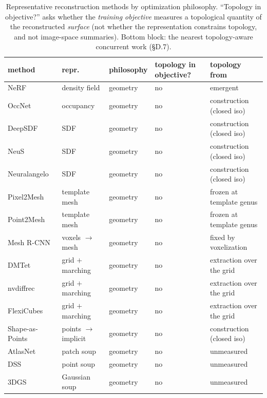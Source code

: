 \begin{table}[t]
\centering
\caption{Representative reconstruction methods by optimization
philosophy. ``Topology in objective?'' asks whether the \emph{training
objective} measures a topological quantity of the reconstructed
\emph{surface} (not whether the representation constrains topology, and
not image-space summaries). Bottom block: the nearest topology-aware
concurrent work (\S D.7).}
\label{tab:philosophy}
\footnotesize
\setlength{\tabcolsep}{3pt}
\begin{tabular}{lllll}
\toprule
method & repr. & philosophy & topology in objective? & topology from \\
\midrule
NeRF~\citep{mildenhall2020nerf} & density field & geometry & no & emergent \\
OccNet~\citep{mescheder2019occupancy} & occupancy & geometry & no & construction (closed iso) \\
DeepSDF~\citep{park2019deepsdf} & SDF & geometry & no & construction (closed iso) \\
NeuS~\citep{wang2021neus} & SDF & geometry & no & construction (closed iso) \\
Neuralangelo~\citep{li2023neuralangelo} & SDF & geometry & no & construction (closed iso) \\
Pixel2Mesh~\citep{wang2018pixel2mesh} & template mesh & geometry & no & frozen at template genus \\
Point2Mesh~\citep{hanocka2020point2mesh} & template mesh & geometry & no & frozen at template genus \\
Mesh R-CNN~\citep{gkioxari2019meshrcnn} & voxels $\to$ mesh & geometry & no & fixed by voxelization \\
DMTet~\citep{shen2021dmtet} & grid $+$ marching & geometry & no & extraction over the grid \\
nvdiffrec~\citep{munkberg2022nvdiffrec} & grid $+$ marching & geometry & no & extraction over the grid \\
FlexiCubes~\citep{shen2023flexicubes} & grid $+$ marching & geometry & no & extraction over the grid \\
Shape-as-Points~\citep{peng2021sap} & points $\to$ implicit & geometry & no & construction (closed iso) \\
AtlasNet~\citep{groueix2018atlasnet} & patch soup & geometry & no & unmeasured \\
DSS~\citep{yifan2019dss} & point soup & geometry & no & unmeasured \\
3DGS~\citep{kerbl2023gaussians} & Gaussian soup & geometry & no & unmeasured \\

\end{tabular}
\end{table}

